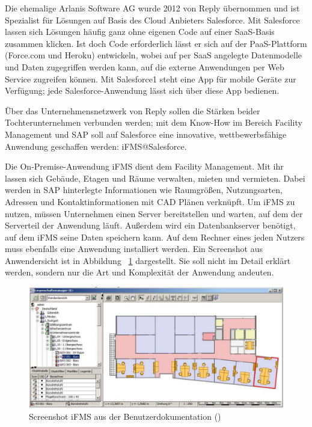 Die ehemalige Arlanis Software AG wurde 2012 von Reply übernommen und ist 
Spezialist für Lösungen auf Basis des Cloud Anbieters Salesforce. Mit 
Salesforce lassen sich Lösungen häufig ganz ohne eigenen Code auf einer 
SaaS-Basis zusammen klicken. Ist doch Code erforderlich lässt er sich auf der 
PaaS-Plattform (Force.com und Heroku) entwickeln, wobei auf per SaaS angelegte 
Datenmodelle und Daten zugegriffen werden kann, auf die externe Anwendungen per 
Web Service zugreifen können. Mit Salesforce1 steht eine App für mobile Geräte 
zur Verfügung; jede Salesforce-Anwendung lässt sich über diese App bedienen. 

Über das Unternehmensnetzwerk von Reply sollen die Stärken beider 
Tochterunternehmen verbunden werden; mit dem Know-How im Bereich Facility 
Management und SAP soll auf Salesforce eine innovative, wettbewerbsfähige 
Anwendung geschaffen werden: iFMS@Salesforce.

Die On-Premise-Anwendung iFMS dient dem Facility Management. Mit ihr lassen 
sich Gebäude, Etagen und Räume verwalten, mieten und vermieten. Dabei werden in 
SAP hinterlegte Informationen wie Raumgrößen, Nutzungsarten, Adressen und 
Kontaktinformationen mit CAD Plänen verknüpft. Um iFMS zu nutzen, müssen 
Unternehmen einen Server bereitstellen und warten, auf dem der Serverteil der 
Anwendung läuft. Außerdem wird ein Datenbankserver benötigt, auf dem iFMS seine 
Daten speichern kann. Auf dem Rechner eines jeden Nutzers muss ebenfalls eine 
Anwendung installiert werden. Ein Screenshot aus Anwendersicht ist in Abbildung 
~\ref{fig:ifms_liegenschaftsbaum} dargestellt. Sie soll nicht im Detail erklärt 
werden, sondern nur die Art und Komplexität der Anwendung andeuten. 

\begin{figure}[!h]
\begin{center}
\includegraphics[width=\textwidth]{images/iFMS_liegenschaftsbaum.png}
\caption{Screenshot iFMS aus der 
Benutzerdokumentation (\protect{}) }
\label{fig:ifms_liegenschaftsbaum}
\end{center}
\end{figure}

